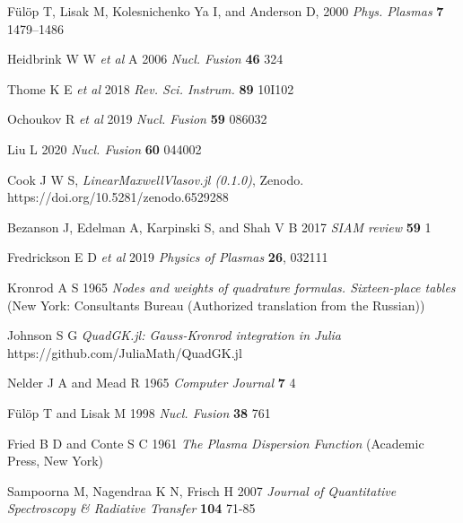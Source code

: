 \documentclass[12pt]{iopart}
\begin{document}
\begin{thebibliography}{9}
F{\"u}l{\"o}p T, Lisak M, Kolesnichenko Ya I, and Anderson D, 2000 \textit{Phys. Plasmas} \textbf{7} 1479–1486

Heidbrink W W \textit{et al} A 2006 \textit{Nucl. Fusion} \textbf{46} 324

Thome K E \textit{et al} 2018 \textit{Rev. Sci. Instrum.} \textbf{89} 10I102

Ochoukov R \textit{et al} 2019 \textit{Nucl. Fusion} \textbf{59} 086032

Liu L  2020 \textit{Nucl. Fusion} \textbf{60} 044002

  Cook J W S, \textit{LinearMaxwellVlasov.jl (0.1.0)}, Zenodo. https://doi.org/10.5281/zenodo.6529288


Bezanson J, Edelman A, Karpinski S, and Shah V B 2017 \textit{SIAM review} \textbf{59} 1

Fredrickson E D \textit{et al} 2019 \textit{Physics of Plasmas} \textbf{26}, 032111

Kronrod A S 1965 \textit{Nodes and weights of quadrature formulas. Sixteen-place tables} (New York: Consultants Bureau (Authorized translation from the Russian))

Johnson S G \textit{QuadGK.jl: Gauss-Kronrod integration in Julia} https://github.com/JuliaMath/QuadGK.jl

Nelder J A and Mead R 1965 \textit{Computer Journal} \textbf{7} 4

F{\"u}l{\"o}p T and Lisak M 1998 \textit{Nucl. Fusion} \textbf{38} 761

Fried B D and Conte S C 1961 \textit{The Plasma Dispersion Function} (Academic Press, New York)

Sampoorna M, Nagendraa K N, Frisch H 2007 \textit{Journal of Quantitative Spectroscopy \& Radiative Transfer} \textbf{104} 71-85


\end{thebibliography}
\end{document}
